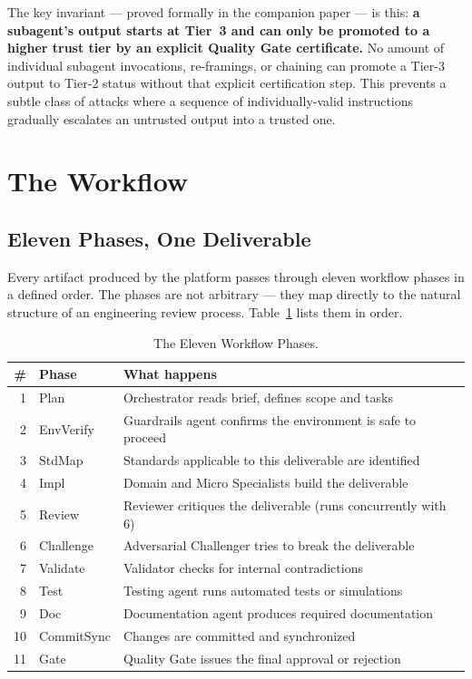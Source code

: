 \documentclass[12pt]{article}
\begin{document}
The key invariant --- proved formally in the companion paper --- is
this: \textbf{a subagent's output starts at Tier~3 and can only be
promoted to a higher trust tier by an explicit Quality Gate
certificate.}
No amount of individual subagent invocations, re-framings, or
chaining can promote a Tier-3 output to Tier-2 status without that
explicit certification step.
This prevents a subtle class of attacks where a sequence of
individually-valid instructions gradually escalates an untrusted
output into a trusted one.

\section{The Workflow}
\label{sec:workflow}

\subsection{Eleven Phases, One Deliverable}

Every artifact produced by the platform passes through eleven
workflow phases in a defined order.
The phases are not arbitrary --- they map directly to the natural
structure of an engineering review process.
Table~\ref{tab:phases} lists them in order.

\begin{table}[H]
\centering
\caption{The Eleven Workflow Phases.}
\label{tab:phases}
\begin{tabular}{@{}rll@{}}
\toprule
\textbf{\#} & \textbf{Phase} & \textbf{What happens} \\
\midrule
1  & Plan          & Orchestrator reads brief, defines scope and tasks \\
2  & EnvVerify     & Guardrails agent confirms the environment is safe to proceed \\
3  & StdMap        & Standards applicable to this deliverable are identified \\
4  & Impl          & Domain and Micro Specialists build the deliverable \\
5  & Review        & Reviewer critiques the deliverable (runs concurrently with 6) \\
6  & Challenge     & Adversarial Challenger tries to break the deliverable \\
7  & Validate      & Validator checks for internal contradictions \\
8  & Test          & Testing agent runs automated tests or simulations \\
9  & Doc           & Documentation agent produces required documentation \\
10 & CommitSync    & Changes are committed and synchronized \\
11 & Gate          & Quality Gate issues the final approval or rejection \\
\bottomrule
\end{tabular}
\end{table}
\end{document}
